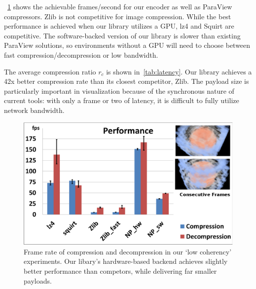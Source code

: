 \documentclass[review]{vgtc}                 %
\begin{document}

~\cref{fig:time} shows the achievable frames/second for our
encoder as well as ParaView compressors.  Zlib is not competitive
for image compression.  While the best performance is achieved when
our library utilizes a GPU, lz4 and Squirt are competitive.  The
software-backed version of our library is slower than existing ParaView
solutions, so environments without a GPU will need to choose between
fast compression/decompression or low bandwidth.

The average compression ratio \(r_c\) is shown
in~\cref{tab:latency}.  Our library achieves a 42x better
compression rate than its closest competitor, Zlib.  The payload size
is particularly important in visualization because of the synchronous
nature of current tools: with only a frame or two of latency, it is
difficult to fully utilize network bandwidth.

%
%

\begin{figure}[t]
  \centering
  \includegraphics[width=\columnwidth]{Performance.eps}
  \caption{Frame rate of compression and decompression in our `low
  coherency' experiments.  Our libary's hardware-based backend achieves
  slightly better performance than competors, while delivering far
  smaller payloads.}
  \label{fig:time}
\end{figure}
\end{document}
